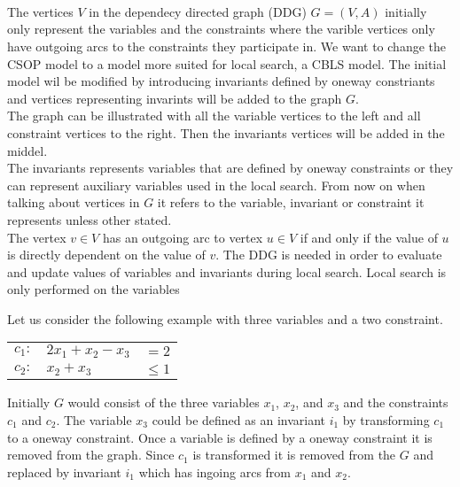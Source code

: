  \\ 
 \\
 \\
The vertices $V$ in the dependecy directed graph (DDG) $G=(V,A)$ initially only represent the variables and the 
constraints where the varible vertices only have outgoing arcs to the constraints they participate in. We want to 
change the CSOP model to a model more suited for local search, a CBLS model. The initial model wil be modified by 
introducing invariants defined by oneway constriants and vertices representing invarints will be added to the graph 
$G$.  \\
The graph can be illustrated with all the variable vertices to the left and all constraint vertices to the right. 
Then the invariants vertices will be added in the middel. \\  
The invariants represents variables that are defined by oneway constraints or they can represent 
auxiliary variables used in the local search.
From now on when talking about vertices in $G$ it refers to the variable, invariant or constraint it represents unless 
other stated. \\
The vertex $v \in V$ has an outgoing arc to vertex $u \in V$ if and only if the value of $u$ is directly dependent on 
the value of $v$.
The DDG is needed in order to evaluate and update values of variables and invariants during local search. Local search 
is only performed on the variables 



Let us consider the following example with three variables and a two constraint.
\begin{center}
\begin{tabular}{rlr}
$ c_1: $&$2x_1 + x_2 - x_3 $&$= 2$ \\
$ c_2: $&$x_2 + x_3 $&$\leq 1$ \\
\end{tabular} 
\end{center}
Initially $G$ would consist of the three variables $x_1$, $x_2$, and $x_3$ and the constraints $c_1$ and $c_2$. The 
variable $x_3$ could be defined as an invariant $i_1$ by transforming $c_1$ to a oneway constraint. Once a 
variable is defined by a oneway constraint it is removed from the graph. Since $c_1$ is transformed it is removed from 
the $G$ and replaced by invariant $i_1$ which has ingoing arcs from $x_1$ and $x_2$. 

